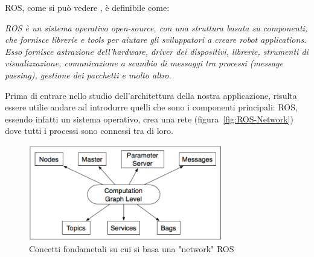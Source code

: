 ROS, come si può vedere \cite{online:ROS-Page}, è definibile come:
\begin{center}
	\emph{ROS è un sistema operativo open-source, con una struttura basata su componenti, che fornisce librerie e tools per aiutare gli sviluppatori a creare robot applications. Esso fornisce astrazione dell'hardware, driver dei dispositivi, librerie, strumenti di visualizzazione, comunicazione a scambio di messaggi tra processi (message passing), gestione dei pacchetti e molto altro}.\\	
\end{center}
Prima di entrare nello studio dell'architettura della nostra applicazione, risulta essere utilie andare ad introdurre quelli che sono i componenti principali: ROS, essendo infatti un sistema operativo, crea una rete (figura~\vref{fig:ROS-Network}) dove tutti i processi sono connessi tra di loro. 
\begin{figure}[h]
	\centering
	\includegraphics[width=0.75\textwidth]{Immagini/ROS_Network}
	\caption{Concetti fondametali su cui si basa una "network" ROS}
	\label{fig:ROS-Network}
\end{figure}

